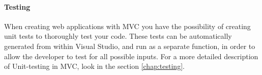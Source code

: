 
\paragraph{Testing}
When creating web applications with MVC you have the possibility of creating unit tests to thoroughly test your code. These tests can be automatically generated from within Visual Studio, and run as a separate function, in order to allow the developer to test for all possible inputs. For a more detailed description of Unit-testing in MVC, look in the section \ref{chap:testing}. \cite{mvcconcept, aspdotnet}